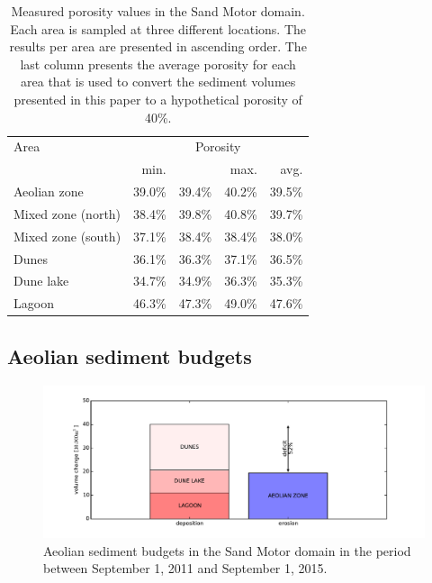 \begin{table}
  \centering
  \caption{Measured porosity values in the Sand Motor domain. Each
    area is sampled at three different locations. The results per area are
    presented in ascending order. The last column presents the average
    porosity for each area that is used to convert the sediment volumes
    presented in this paper to a hypothetical porosity of 40\%.}
  \label{tab:porosity}
  \begin{tabular}{lrrrr}
    Area                     & \multicolumn{4}{c}{Porosity}      \\
                             & min.   &        & max.   & avg.   \\
    \hline 
    Aeolian zone             & 39.0\% & 39.4\% & 40.2\% & 39.5\% \\
    Mixed zone (north)       & 38.4\% & 39.8\% & 40.8\% & 39.7\% \\
    Mixed zone (south)       & 37.1\% & 38.4\% & 38.4\% & 38.0\% \\
    Dunes                    & 36.1\% & 36.3\% & 37.1\% & 36.5\% \\
    Dune lake                & 34.7\% & 34.9\% & 36.3\% & 35.3\% \\
    Lagoon                   & 46.3\% & 47.3\% & 49.0\% & 47.6\% \\
  \end{tabular}
\end{table}

\subsection{Aeolian sediment budgets}
\label{sec:budgets}

\begin{figure}
  \centering
  \includegraphics[width=\columnwidth]{../Figures/volumes_bars}
  \caption{Aeolian sediment budgets in the Sand Motor domain in the
    period between September 1, 2011 and September 1, 2015.}
  \label{fig:volumes_bars}
\end{figure}

